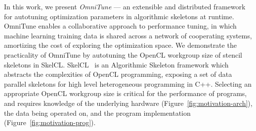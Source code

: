 \documentclass[times, 10pt,twocolumn]{article}
\begin{document}
  In this work, we present \textit{OmniTune} --- an extensible and
  distributed framework for autotuning optimization parameters in
  algorithmic skeletons at runtime. OmniTune enables a collaborative
  approach to performance tuning, in which machine learning training
  data is shared across a network of cooperating systems, amortizing the
  cost of exploring the optimization space. We demonstrate the
  practicality of OmniTune by autotuning the OpenCL workgroup size of
  stencil skeletons in SkelCL. SkelCL~\cite{Steuwer2011} is an
  Algorithmic Skeleton framework which abstracts the complexities of
  OpenCL programming, exposing a set of data parallel skeletons for high
  level heterogeneous programming in C++. Selecting an appropriate
  OpenCL workgroup size is critical for the performance of programs, and
  requires knowledge of the underlying hardware
  (Figure~\ref{fig:motivation-arch}), the data being operated on, and
  the program implementation (Figure~\ref{fig:motivation-prog}).
\end{document}

